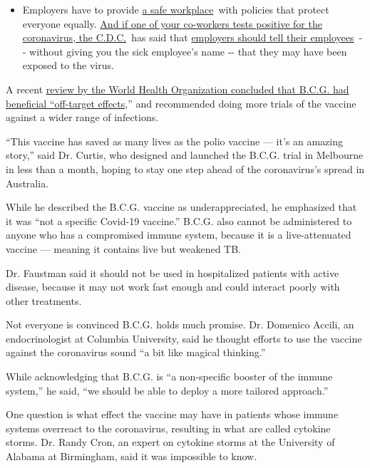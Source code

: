 \begin{itemize}
  \begin{itemize}
  \tightlist
  \item
    Employers have to provide
    \href{https://www.osha.gov/SLTC/covid-19/standards.html}{a safe
    workplace}~with policies that protect everyone equally.
    \href{https://www.nytimes3xbfgragh.onion/article/coronavirus-money-unemployment.html?action=click\&pgtype=Article\&state=default\&region=MAIN_CONTENT_3\&context=storylines_faq}{And
    if one of your co-workers tests positive for the coronavirus, the
    C.D.C.}~has said that
    \href{https://www.cdc.gov/coronavirus/2019-ncov/community/guidance-business-response.html}{employers
    should tell their employees}~-\/- without giving you the sick
    employee's name -\/- that they may have been exposed to the virus.
  \end{itemize}
\end{itemize}

A recent
\href{https://www.who.int/immunization/sage/meetings/2017/october/1_BCG_report_revised_version_online.pdf}{review
by the World Health Organization concluded that B.C.G. had beneficial
``off-target effects},'' and recommended doing more trials of the
vaccine against a wider range of infections.

``This vaccine has saved as many lives as the polio vaccine --- it's an
amazing story,'' said Dr. Curtis, who designed and launched the B.C.G.
trial in Melbourne in less than a month, hoping to stay one step ahead
of the coronavirus's spread in Australia.

While he described the B.C.G. vaccine as underappreciated, he emphasized
that it was ``not a specific Covid-19 vaccine.'' B.C.G. also cannot be
administered to anyone who has a compromised immune system, because it
is a live-attenuated vaccine --- meaning it contains live but weakened
TB.

Dr. Faustman said it should not be used in hospitalized patients with
active disease, because it may not work fast enough and could interact
poorly with other treatments.

Not everyone is convinced B.C.G. holds much promise. Dr. Domenico
Accili, an endocrinologist at Columbia University, said he thought
efforts to use the vaccine against the coronavirus sound ``a bit like
magical thinking.''

While acknowledging that B.C.G. is ``a non-specific booster of the
immune system,'' he said, ``we should be able to deploy a more tailored
approach.''

One question is what effect the vaccine may have in patients whose
immune systems overreact to the coronavirus, resulting in what are
called cytokine storms. Dr. Randy Cron, an expert on cytokine storms at
the University of Alabama at Birmingham, said it was impossible to know.

